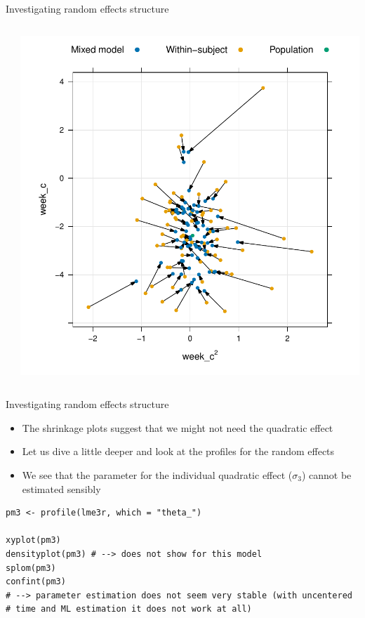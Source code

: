 \documentclass[aspectratio=169]{beamer}
\begin{document}
\begin{frame}[fragile]{Investigating random effects structure}
\begin{columns}
\begin{column}{.35\textwidth}
    \end{column}
    \begin{column}{.35\textwidth}
      \includegraphics[scale=.35]{../figures/hdrs_shrinkage_week-weeksq}
    \end{column}
  \end{columns}
\end{frame}

\begin{frame}[fragile]{Investigating random effects structure}
  \begin{itemize}
    \item The shrinkage plots suggest that we might not need the quadratic
      effect
    \item Let us dive a little deeper and look at the profiles for the random
      effects
    \item We see that the parameter for the individual quadratic effect
      ($\sigma_3$) cannot be estimated sensibly
  \end{itemize}
\begin{lstlisting}
pm3 <- profile(lme3r, which = "theta_")

xyplot(pm3)
densityplot(pm3) # --> does not show for this model
splom(pm3)
confint(pm3)
# --> parameter estimation does not seem very stable (with uncentered
# time and ML estimation it does not work at all)
\end{lstlisting}
\end{frame}
\end{document}
